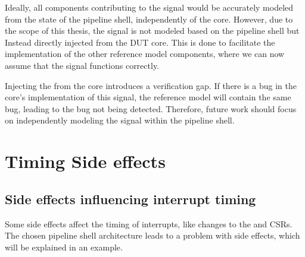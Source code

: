 Ideally, all components contributing to the  signal would be accurately modeled from the state of the pipeline shell, independently of the core. However, due to the scope of this thesis, the  signal is not modeled based on the pipeline shell but Instead directly injected from the DUT core. This is done to facilitate the implementation of the other reference model components, where we can now assume that the  signal functions correctly.

Injecting the  from the core introduces a verification gap. If there is a bug in the core's implementation of this signal, the reference model will contain the same bug, leading to the bug not being detected. Therefore, future work should focus on independently modeling the  signal within the pipeline shell.

%





\section{Timing Side effects}%
\label{sec:ps_side-effects}

\subsection{Side effects influencing interrupt timing}

Some side effects affect the timing of interrupts, like changes to the  and  CSRs. The chosen pipeline shell architecture leads to a problem with side effects, which will be explained in an example.

